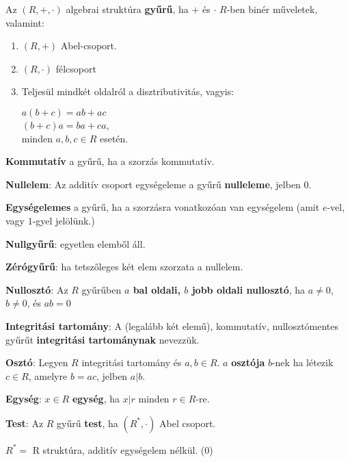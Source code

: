 \begin{frame}
  \begin{tcolorbox}[title={Def.: Gyűrűk}]
    Az $(R, +, {\cdot})$ algebrai struktúra \textbf{gyűrű}, ha $+$ és $\cdot$ $R$-ben binér műveletek, valamint:\\
    \begin{enumerate}
      \item $(R, +)$ Abel-csoport.
      \item $(R, {\cdot})$ félcsoport
      \item Teljesül mindkét oldalról a disztributivitás, vagyis:\\
      \msmallskip
      
      $a(b + c) = ab + ac$\\
      $(b+ c)a = ba + ca$,\\
      minden $a, b, c \in R$ esetén.
    \end{enumerate}
    \mbigskip

    \textbf{Kommutatív} a gyűrű, ha a szorzás kommutatív.\\
    \mmedskip

    \textbf{Nullelem}: Az additív csoport egységeleme a gyűrű \textbf{nulleleme}, jelben 0.\\
    \mmedskip

    \textbf{Egységelemes} a gyűrű, ha a szorzásra vonatkozóan van egységelem (amit $e$-vel, vagy $1$-gyel jelölünk.)\\
    \mmedskip

    \textbf{Nullgyűrű}: egyetlen elemből áll.\\
    \mmedskip

    \textbf{Zérógyűrű}: ha tetszőleges két elem szorzata a nullelem.\\
    \mmedskip

    \textbf{Nullosztó}: Az $R$ gyűrűben \textbf{$a$ bal oldali, $b$ jobb oldali nullosztó}, ha $a \neq 0$, $b \neq 0$, és $ab = 0$\\
    \mmedskip

    \textbf{Integritási tartomány}: A (legalább két elemű), kommutatív, nullosztómentes gyűrűt \textbf{integritási tartománynak} nevezzük.\\
    \mmedskip

    \textbf{Osztó}: Legyen $R$ integritási tartomány és $a, b \in R$. $a$ \textbf{osztója} $b$-nek ha létezik $c \in R$, amelyre $b = ac$, jelben $a | b$.\\
    \mmedskip

    \textbf{Egység}: $x \in R$ \textbf{egység}, ha $x | r$ minden $r \in R$-re.\\
    \mmedskip

    \textbf{Test}: Az $R$ gyűrű \textbf{test}, ha $(R^*, {\cdot})$ Abel csoport.\\
    \msmallskip
    
    {\footnotesize $R^* =$ R struktúra, additív egységelem nélkül. (0)}
  \end{tcolorbox}
\end{frame}


